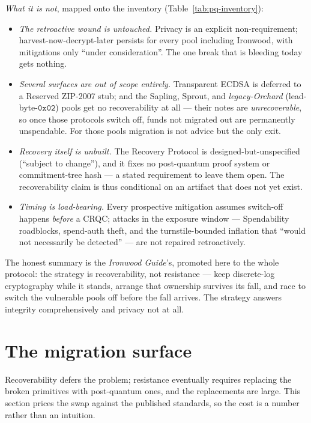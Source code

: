 \documentclass[11pt,a4paper]{article}
\theoremstyle{definition}
\begin{document}
\emph{What it is not}, mapped onto the inventory
(Table~\ref{tab:pq-inventory}):

\begin{itemize}[leftmargin=*]
\item \emph{The retroactive wound is untouched.} Privacy is an explicit
non-requirement; harvest-now-decrypt-later persists for every pool
including Ironwood, with mitigations only ``under consideration''. The
one break that is bleeding today gets nothing.
\item \emph{Several surfaces are out of scope entirely.} Transparent
ECDSA is deferred to a Reserved ZIP-2007 stub; and the Sapling, Sprout,
and \emph{legacy-Orchard} (lead-byte-$\mathtt{0x02}$) pools get no
recoverability at all --- their notes are \emph{unrecoverable}, so once
those protocols switch off, funds not migrated out are permanently
unspendable. For those pools migration is not advice but the only exit.
\item \emph{Recovery itself is unbuilt.} The Recovery Protocol is
designed-but-unspecified (``subject to change''), and it fixes no
post-quantum proof system or commitment-tree hash --- a stated
requirement to leave them open. The recoverability claim is thus
conditional on an artifact that does not yet exist.
\item \emph{Timing is load-bearing.} Every prospective mitigation
assumes switch-off happens \emph{before} a CRQC; attacks in the
exposure window --- Spendability roadblocks, spend-auth theft, and the
turnstile-bounded inflation that ``would not necessarily be detected''
--- are not repaired retroactively.
\end{itemize}

The honest summary is the \emph{Ironwood Guide}'s, promoted here to the
whole protocol: the strategy is recoverability, not resistance --- keep
discrete-log cryptography while it stands, arrange that ownership
survives its fall, and race to switch the vulnerable pools off before
the fall arrives. The strategy answers integrity comprehensively and
privacy not at all.

\FloatBarrier

\section{The migration surface}\label{sec:pq-migration}

Recoverability defers the problem; resistance eventually requires
replacing the broken primitives with post-quantum ones, and the
replacements are large. This section prices the swap against the
published standards, so the cost is a number rather than an intuition.
\end{document}

